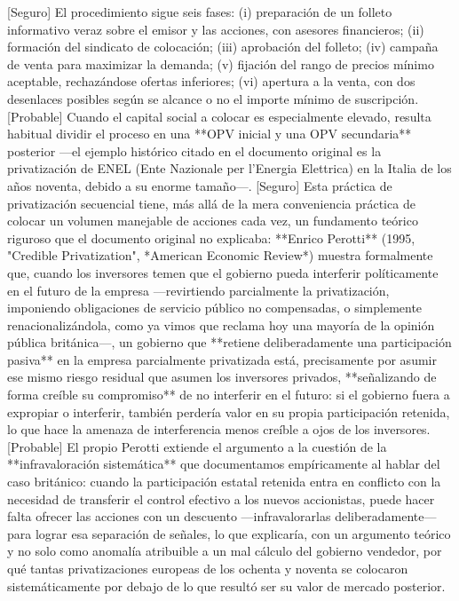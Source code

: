 \documentclass[10pt,a4paper]{article}
\begin{document}
[Seguro] El procedimiento sigue seis fases: (i) preparación de un folleto informativo veraz sobre el emisor y las acciones, con asesores financieros; (ii) formación del sindicato de colocación; (iii) aprobación del folleto; (iv) campaña de venta para maximizar la demanda; (v) fijación del rango de precios mínimo aceptable, rechazándose ofertas inferiores; (vi) apertura a la venta, con dos desenlaces posibles según se alcance o no el importe mínimo de suscripción. [Probable] Cuando el capital social a colocar es especialmente elevado, resulta habitual dividir el proceso en una **OPV inicial y una OPV secundaria** posterior —el ejemplo histórico citado en el documento original es la privatización de ENEL (Ente Nazionale per l'Energia Elettrica) en la Italia de los años noventa, debido a su enorme tamaño—. [Seguro] Esta práctica de privatización secuencial tiene, más allá de la mera conveniencia práctica de colocar un volumen manejable de acciones cada vez, un fundamento teórico riguroso que el documento original no explicaba: **Enrico Perotti** (1995, "Credible Privatization", *American Economic Review*) muestra formalmente que, cuando los inversores temen que el gobierno pueda interferir políticamente en el futuro de la empresa —revirtiendo parcialmente la privatización, imponiendo obligaciones de servicio público no compensadas, o simplemente renacionalizándola, como ya vimos que reclama hoy una mayoría de la opinión pública británica—, un gobierno que **retiene deliberadamente una participación pasiva** en la empresa parcialmente privatizada está, precisamente por asumir ese mismo riesgo residual que asumen los inversores privados, **señalizando de forma creíble su compromiso** de no interferir en el futuro: si el gobierno fuera a expropiar o interferir, también perdería valor en su propia participación retenida, lo que hace la amenaza de interferencia menos creíble a ojos de los inversores. [Probable] El propio Perotti extiende el argumento a la cuestión de la **infravaloración sistemática** que documentamos empíricamente al hablar del caso británico: cuando la participación estatal retenida entra en conflicto con la necesidad de transferir el control efectivo a los nuevos accionistas, puede hacer falta ofrecer las acciones con un descuento —infravalorarlas deliberadamente— para lograr esa separación de señales, lo que explicaría, con un argumento teórico y no solo como anomalía atribuible a un mal cálculo del gobierno vendedor, por qué tantas privatizaciones europeas de los ochenta y noventa se colocaron sistemáticamente por debajo de lo que resultó ser su valor de mercado posterior.
\end{document}
